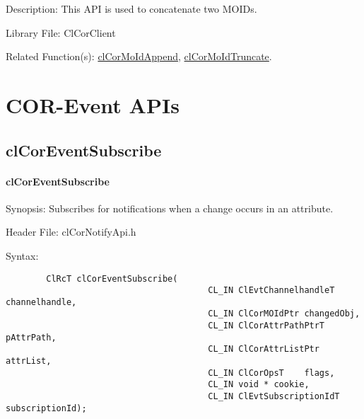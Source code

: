 \begin{flushleft}
\begin{Desc}
\begin{description}
\end{description}
\end{Desc}
\begin{Desc}
\item[Description:]This API is used to concatenate two MOIDs.\end{Desc}
\begin{Desc}
\item[Library File:]Cl\-Cor\-Client\end{Desc}
\begin{Desc}
\item[Related Function(s):]\hyperlink{pagecor117}{cl\-Cor\-MoId\-Append}, \hyperlink{pagecor115}{cl\-Cor\-MoId\-Truncate}. \end{Desc}
\newpage


\section{COR-Event APIs}

\subsection{clCorEventSubscribe}
\hypertarget{pagecor133}{}\paragraph{cl\-Cor\-Event\-Subscribe}\label{pagecor133}
\begin{Desc}
\item[Synopsis:]Subscribes for notifications when a change occurs in an attribute.\end{Desc}
\begin{Desc}
\item[Header File:]clCorNotifyApi.h\end{Desc}
\begin{Desc}
\item[Syntax:]

\footnotesize\begin{verbatim}        ClRcT clCorEventSubscribe(
                                 		CL_IN ClEvtChannelhandleT channelhandle,
                                 		CL_IN ClCorMOIdPtr changedObj,
                                 		CL_IN ClCorAttrPathPtrT  pAttrPath,
                                 		CL_IN ClCorAttrListPtr attrList,
                                 		CL_IN ClCorOpsT    flags,
                                 		CL_IN void * cookie,
                                 		CL_IN ClEvtSubscriptionIdT subscriptionId);
\end{verbatim}
\normalsize
\end{Desc}


\end{flushleft}
